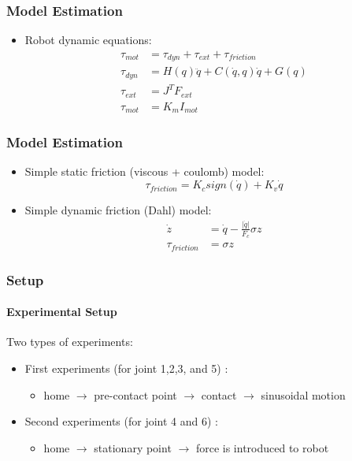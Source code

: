 \documentclass[12pt,english]{beamer}
\begin{document}
  \begin{frame}
    \frametitle{Model Estimation}
    \begin{itemize}
      \item Robot dynamic equations:
      \begin{align}
        \tau_{mot} &= \tau_{dyn} + \tau_{ext} + \tau_{friction}\\
        \tau_{dyn} &= H\left(q\right)\ddot{q} + C\left(\dot{q} , q \right)\dot{q} + G\left(q \right)\\
        \tau_{ext} &= J^{T} F_{ext}\\
        \tau_{mot} &= K_{m} I_{mot}
      \end{align}
    \end{itemize}
  \end{frame}
  
  \begin{frame}
    \frametitle{Model Estimation}
    \begin{itemize}
      \item Simple static friction (viscous + coulomb) model:
      \begin{equation}
        \tau_{friction} = K_{c} sign\left(\dot{q}\right) + K_{v} \dot{q}
      \end{equation}
      \item Simple dynamic friction (Dahl) model:
      \begin{align}
        \dot{z} &= \dot{q} - \frac{\left|\dot{q}\right|}{F_{c}} \sigma z \\
        \tau_{friction} &= \sigma z
      \end{align}
    \end{itemize}
  \end{frame}
  
  \begin{frame}
    \frametitle{Setup}
    \framesubtitle{Experimental Setup}
    Two types of experiments:
    \begin{itemize}
    \item First experiments (for joint 1,2,3, and 5) :
      \begin{itemize}
        \item home $\rightarrow$ pre-contact point $\rightarrow$ contact $\rightarrow$ sinusoidal motion
      \end{itemize}
    \item Second experiments (for joint 4 and 6) :
      \begin{itemize}
        \item home $\rightarrow$ stationary point $\rightarrow$ force is introduced to robot
      \end{itemize}
    \end{itemize}
  \end{frame}
  
\end{document}
